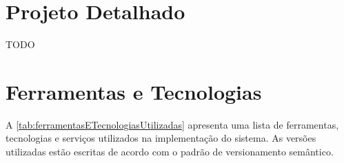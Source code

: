 \section{Projeto Detalhado}
\label{sec:projetoDetalhado}

TODO




\section{Ferramentas e Tecnologias}
\label{sec:ferramentasETecnologias}

A \autoref{tab:ferramentasETecnologiasUtilizadas} apresenta uma lista de ferramentas, tecnologias e serviços utilizados na implementação do sistema. As versões utilizadas estão escritas de acordo com o padrão de versionamento semântico. \citep{semverdocs}

